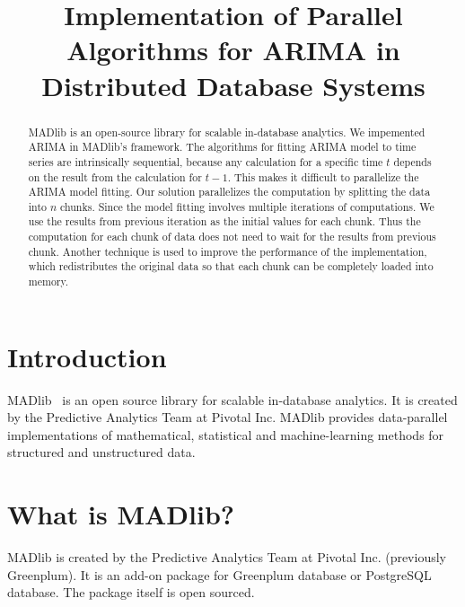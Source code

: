 \documentclass[english,12pt]{article}
\begin{document}
\title{Implementation of Parallel Algorithms for ARIMA in Distributed
  Database Systems}


\maketitle

\begin{abstract}
    MADlib is an open-source library for scalable in-database analytics. We
    impemented ARIMA in MADlib's framework. The algorithms for fitting ARIMA
    model to time series are intrinsically sequential, because any calculation
    for a specific time $t$ depends on the result from the calculation for
    $t-1$.  This makes it difficult to parallelize the ARIMA model fitting. Our
    solution parallelizes the computation by splitting the data into $n$
    chunks. Since the model fitting involves multiple iterations of
    computations. We use the results from previous iteration as the initial
    values for each chunk. Thus the computation for each chunk of data does not
    need to wait for the results from previous chunk. Another technique is used
    to improve the performance of the implementation, which redistributes the
    original data so that each chunk can be completely loaded into memory.
\end{abstract}


\section{Introduction}

MADlib~\cite{madlib} is an open source library for scalable in-database
analytics.  It is created by the Predictive Analytics Team at Pivotal Inc.
MADlib provides data-parallel implementations of mathematical, statistical and
machine-learning methods for structured and unstructured data.

\section{What is MADlib?}


MADlib is created by the Predictive Analytics Team at Pivotal Inc. (previously
Greenplum). It is an add-on package for Greenplum database or PostgreSQL
database. The package itself is open sourced.
\end{document}
